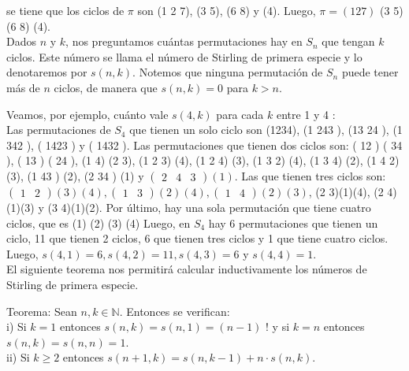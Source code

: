 \documentclass[10pt]{article}
\begin{document}
se tiene que los ciclos de $\pi$ son (1 2 7), (3 5), (6 8) y (4). Luego, $\pi=(127)$ (3 5) (6 8) (4).\\
Dados $n$ y $k$, nos preguntamos cuántas permutaciones hay en $S_{n}$ que tengan $k$ ciclos. Este número se llama el número de Stirling de primera especie y lo denotaremos por $s(n, k)$. Notemos que ninguna permutación de $S_{n}$ puede tener más de $n$ ciclos, de manera que $s(n, k)=0$ para $k>n$.

Veamos, por ejemplo, cuánto vale $s(4, k)$ para cada $k$ entre 1 y 4 :\\
Las permutaciones de $S_{4}$ que tienen un solo ciclo son (1234), (1 243 ), (13 24 ), (1 342 ), ( 1423 ) y ( 1432 ). Las permutaciones que tienen dos ciclos son: ( 12 ) ( 34 ), ( 13 ) ( 24 ), (1 4) (2 3), (1 2 3) (4), (1 2 4) (3), (1 3 2) (4), (1 3 4) (2), (1 4 2) (3), (1 43 ) (2), (2 34 ) (1) y $\left(\begin{array}{lll}2 & 4 & 3\end{array}\right)(1)$. Las que tienen tres ciclos son: $\left(\begin{array}{ll}1 & 2\end{array}\right)(3)(4),\left(\begin{array}{ll}1 & 3\end{array}\right)(2)(4),\left(\begin{array}{ll}1 & 4\end{array}\right)(2)(3)$, (2 3)(1)(4), (2 4)(1)(3) y (3 4)(1)(2). Por último, hay una sola permutación que tiene cuatro ciclos, que es (1) (2) (3) (4) Luego, en $S_{4}$ hay 6 permutaciones que tienen un ciclo, 11 que tienen 2 ciclos, 6 que tienen tres ciclos y 1 que tiene cuatro ciclos.\\
Luego, $s(4,1)=6, s(4,2)=11, s(4,3)=6$ y $s(4,4)=1$.\\
El siguiente teorema nos permitirá calcular inductivamente los números de Stirling de primera especie.

Teorema: Sean $n, k \in \mathbb{N}$. Entonces se verifican:\\
i) Si $k=1$ entonces $s(n, k)=s(n, 1)=(n-1)$ ! y si $k=n$ entonces $s(n, k)=s(n, n)=1$.\\
ii) Si $k \geq 2$ entonces $s(n+1, k)=s(n, k-1)+n \cdot s(n, k)$.
\end{document}
